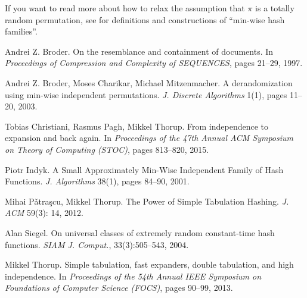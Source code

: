 \documentclass[12pt]{article}
\begin{document}
If you want to read more about how to relax the assumption that $\pi$ is a totally random permutation, see \cite{BCM03,Indyk01,PT12} for definitions and constructions of ``min-wise hash families''.


\begin{thebibliography}{}

 Andrei Z. Broder.
On the resemblance and containment of documents.
In {\em Proceedings of Compression and Complexity of SEQUENCES}, pages 21--29, 1997.

Andrei Z. Broder, Moses Charikar, Michael Mitzenmacher.
A derandomization using min-wise independent permutations.
{\em J. Discrete Algorithms} 1(1), pages 11--20, 2003.

Tobias Christiani, Rasmus Pagh, Mikkel Thorup.
From independence to expansion and back again.
In {\em Proceedings of the 47th Annual ACM Symposium on Theory of Computing (STOC)}, pages 813--820, 2015.

Piotr Indyk.
A Small Approximately Min-Wise Independent Family of Hash Functions.
{\em J. Algorithms} 38(1), pages 84--90, 2001.

Mihai P\v{a}tra\c{s}cu, Mikkel Thorup.
The Power of Simple Tabulation Hashing.
{\em J. ACM} 59(3): 14, 2012.

Alan Siegel.
On universal classes of extremely random constant-time hash functions.
{\em SIAM J. Comput.}, 33(3):505--543, 2004.

Mikkel Thorup.
Simple tabulation, fast expanders, double tabulation, and high independence. 
In {\em Proceedings of the 54th Annual IEEE Symposium on Foundations of Computer Science (FOCS)}, pages 90--99, 2013.

\end{thebibliography}
\end{document}
